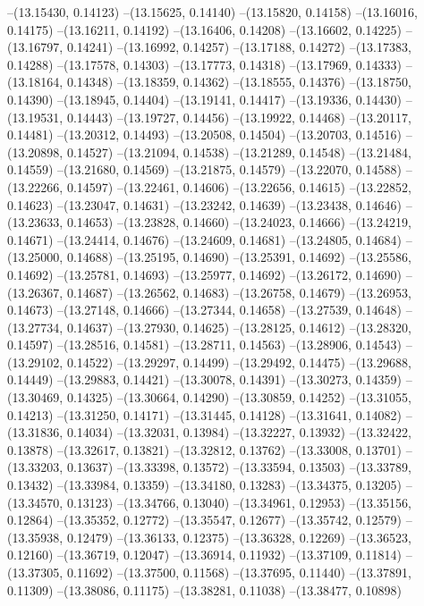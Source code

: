 --(13.15430, 0.14123)
--(13.15625, 0.14140)
--(13.15820, 0.14158)
--(13.16016, 0.14175)
--(13.16211, 0.14192)
--(13.16406, 0.14208)
--(13.16602, 0.14225)
--(13.16797, 0.14241)
--(13.16992, 0.14257)
--(13.17188, 0.14272)
--(13.17383, 0.14288)
--(13.17578, 0.14303)
--(13.17773, 0.14318)
--(13.17969, 0.14333)
--(13.18164, 0.14348)
--(13.18359, 0.14362)
--(13.18555, 0.14376)
--(13.18750, 0.14390)
--(13.18945, 0.14404)
--(13.19141, 0.14417)
--(13.19336, 0.14430)
--(13.19531, 0.14443)
--(13.19727, 0.14456)
--(13.19922, 0.14468)
--(13.20117, 0.14481)
--(13.20312, 0.14493)
--(13.20508, 0.14504)
--(13.20703, 0.14516)
--(13.20898, 0.14527)
--(13.21094, 0.14538)
--(13.21289, 0.14548)
--(13.21484, 0.14559)
--(13.21680, 0.14569)
--(13.21875, 0.14579)
--(13.22070, 0.14588)
--(13.22266, 0.14597)
--(13.22461, 0.14606)
--(13.22656, 0.14615)
--(13.22852, 0.14623)
--(13.23047, 0.14631)
--(13.23242, 0.14639)
--(13.23438, 0.14646)
--(13.23633, 0.14653)
--(13.23828, 0.14660)
--(13.24023, 0.14666)
--(13.24219, 0.14671)
--(13.24414, 0.14676)
--(13.24609, 0.14681)
--(13.24805, 0.14684)
--(13.25000, 0.14688)
--(13.25195, 0.14690)
--(13.25391, 0.14692)
--(13.25586, 0.14692)
--(13.25781, 0.14693)
--(13.25977, 0.14692)
--(13.26172, 0.14690)
--(13.26367, 0.14687)
--(13.26562, 0.14683)
--(13.26758, 0.14679)
--(13.26953, 0.14673)
--(13.27148, 0.14666)
--(13.27344, 0.14658)
--(13.27539, 0.14648)
--(13.27734, 0.14637)
--(13.27930, 0.14625)
--(13.28125, 0.14612)
--(13.28320, 0.14597)
--(13.28516, 0.14581)
--(13.28711, 0.14563)
--(13.28906, 0.14543)
--(13.29102, 0.14522)
--(13.29297, 0.14499)
--(13.29492, 0.14475)
--(13.29688, 0.14449)
--(13.29883, 0.14421)
--(13.30078, 0.14391)
--(13.30273, 0.14359)
--(13.30469, 0.14325)
--(13.30664, 0.14290)
--(13.30859, 0.14252)
--(13.31055, 0.14213)
--(13.31250, 0.14171)
--(13.31445, 0.14128)
--(13.31641, 0.14082)
--(13.31836, 0.14034)
--(13.32031, 0.13984)
--(13.32227, 0.13932)
--(13.32422, 0.13878)
--(13.32617, 0.13821)
--(13.32812, 0.13762)
--(13.33008, 0.13701)
--(13.33203, 0.13637)
--(13.33398, 0.13572)
--(13.33594, 0.13503)
--(13.33789, 0.13432)
--(13.33984, 0.13359)
--(13.34180, 0.13283)
--(13.34375, 0.13205)
--(13.34570, 0.13123)
--(13.34766, 0.13040)
--(13.34961, 0.12953)
--(13.35156, 0.12864)
--(13.35352, 0.12772)
--(13.35547, 0.12677)
--(13.35742, 0.12579)
--(13.35938, 0.12479)
--(13.36133, 0.12375)
--(13.36328, 0.12269)
--(13.36523, 0.12160)
--(13.36719, 0.12047)
--(13.36914, 0.11932)
--(13.37109, 0.11814)
--(13.37305, 0.11692)
--(13.37500, 0.11568)
--(13.37695, 0.11440)
--(13.37891, 0.11309)
--(13.38086, 0.11175)
--(13.38281, 0.11038)
--(13.38477, 0.10898)
